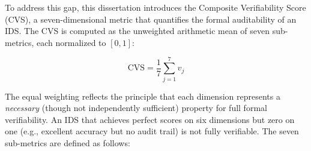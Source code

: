 \documentclass[12pt, letterpaper, oneside]{report}
\begin{document}
To address this gap, this dissertation introduces the Composite Verifiability Score (CVS), a seven-dimensional metric that quantifies the formal auditability of an IDS. The CVS is computed as the unweighted arithmetic mean of seven sub-metrics, each normalized to $[0, 1]$:

\begin{equation}
\label{eq:cvs}
\text{CVS} = \frac{1}{7} \sum_{j=1}^{7} v_j
\end{equation}

The equal weighting reflects the principle that each dimension represents a \emph{necessary} (though not independently sufficient) property for full formal verifiability. An IDS that achieves perfect scores on six dimensions but zero on one (e.g., excellent accuracy but no audit trail) is not fully verifiable. The seven sub-metrics are defined as follows:
\end{document}
